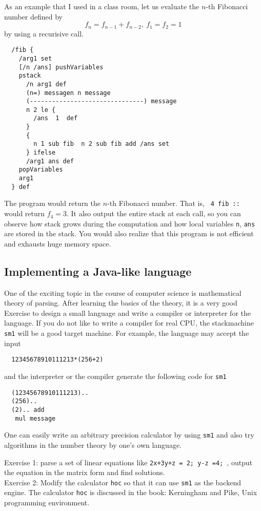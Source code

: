 As an example that I used in a class room, 
let us evaluate the $n$-th Fibonacci number
defined by
$$ f_n = f_{n-1}+f_{n-2}, \ f_1 = f_2 = 1 $$
by using a recurisive call.
\begin{verbatim}
  /fib {
    /arg1 set 
    [/n /ans] pushVariables
    pstack
      /n arg1 def
      (n=) messagen n message
      (-------------------------------) message
      n 2 le {
        /ans  1  def
      }
      {
        n 1 sub fib  n 2 sub fib add /ans set
      } ifelse
      /arg1 ans def
    popVariables
    arg1
  } def
\end{verbatim}
The program would return the $n$-th Fibonacci number.
That is,
\verb+ 4 fib :: +
would return $f_4=3$.
It also output the entire stack at each call,
so you can observe how stack grows during the computation
and how local variables {\tt n}, {\tt ans} are stored 
in the stack.
You would also realize that this program is not efficient
and exhausts huge memory space.


\subsection{Implementing  a Java-like language}

One of the exciting topic in the course of computer science
is mathematical theory of parsing.
After learning the basics of the theory,
it is a very good Exercise to design a small language and
write a compiler or interpreter for the language.
If you do not like to write a compiler for real CPU,
the stackmachine {\tt sm1} will be a good target
machine.
For example, the language may accept the input
\begin{verbatim}
  12345678910111213*(256+2)
\end{verbatim}
and the interpreter or the compiler generate the following code for {\tt sm1}
\begin{verbatim}
  (12345678910111213)..
  (256)..
  (2).. add
   mul message
\end{verbatim}
One can easily write an arbitrary precision calculator by using
{\tt sm1}
and also try algorithms in the number theory by one's own language.

\noindent
Exercise 1: parse a set of linear equations like
{\tt  2x+3y+z = 2; y-z =4; }, output the equation in the matrix form
and find solutions. \\
Exercise 2: 
Modify the calculator {\tt hoc} so that it can use {\tt sm1} as the
backend engine.
The calculator {\tt hoc} is discussed in the book:
Kerningham and Pike, Unix programming environment.

